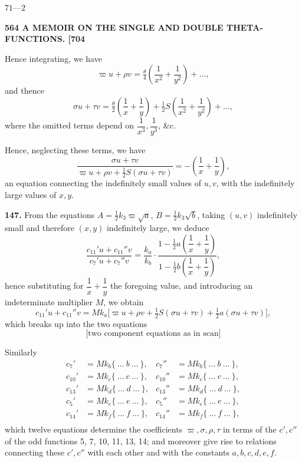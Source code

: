 \documentclass[11pt]{article}
\begin{document}
\hfill $71$---$2$

\newpage
\noindent\textbf{564 \hfill A MEMOIR ON THE SINGLE AND DOUBLE THETA-FUNCTIONS. \hfill [704}

\medskip
Hence integrating, we have
\[
\varpi u + \rho v = \tfrac{\theta}{4}\!\left(\frac{1}{x^2} + \frac{1}{y^2}\right) + \ldots,
\]
and thence
\[
\sigma u + \tau v = \tfrac{\theta}{2}\!\left(\frac{1}{x} + \frac{1}{y}\right) + \tfrac{1}{2}S\!\left(\frac{1}{x^2} + \frac{1}{y^2}\right) + \ldots,
\]
where the omitted terms depend on $\dfrac{1}{x^3},\dfrac{1}{y^3}$, \&c.

\medskip
Hence, neglecting these terms, we have
\[
\frac{\sigma u + \tau v}{\varpi u + \rho v + \tfrac{1}{2}S(\sigma u + \tau v)} = -\!\left(\frac{1}{x} + \frac{1}{y}\right),
\]
an equation connecting the indefinitely small values of $u, v$, with the indefinitely large values of $x, y$.

\medskip
\textbf{147.} From the equations $A = \tfrac{1}{2}k_3\varpi\sqrt{a}$, $B = \tfrac{1}{2}k_3\sqrt{b}$, taking $(u, v)$ indefinitely small and therefore $(x, y)$ indefinitely large, we deduce
\[
\frac{c_{11}'u + c_{11}''v}{c_7'u + c_7''v} = \frac{k_a}{k_b}\cdot\frac{1 - \tfrac{1}{2}a\!\left(\dfrac{1}{x} + \dfrac{1}{y}\right)}{1 - \tfrac{1}{2}b\!\left(\dfrac{1}{x} + \dfrac{1}{y}\right)},
\]
hence substituting for $\dfrac{1}{x} + \dfrac{1}{y}$ the foregoing value, and introducing an indeterminate multiplier $M$, we obtain
\[
c_{11}'u + c_{11}''v = Mk_a\bigl[\varpi u + \rho v + \tfrac{1}{2}S(\sigma u + \tau v) + \tfrac{1}{2}a(\sigma u + \tau v)\bigr],
\]
which breaks up into the two equations
\[
\text{[two component equations as in scan]}
\]

Similarly
\[
\begin{aligned}
c_7' &= Mk_b\{\ \ldots\ b\ \ldots\ \}, & c_7'' &= Mk_b\{\ \ldots\ b\ \ldots\ \},\\
c_{10}' &= Mk_c\{\ \ldots\ c\ \ldots\ \}, & c_{10}'' &= Mk_c\{\ \ldots\ c\ \ldots\ \},\\
c_{13}' &= Mk_d\{\ \ldots\ d\ \ldots\ \}, & c_{13}'' &= Mk_d\{\ \ldots\ d\ \ldots\ \},\\
c_5' &= Mk_e\{\ \ldots\ e\ \ldots\ \}, & c_5'' &= Mk_e\{\ \ldots\ e\ \ldots\ \},\\
c_{14}' &= Mk_f\{\ \ldots\ f\ \ldots\ \}, & c_{14}'' &= Mk_f\{\ \ldots\ f\ \ldots\ \},\\
\end{aligned}
\]
which twelve equations determine the coefficients $\varpi, \sigma, \rho, \tau$ in terms of the $c', c''$ of the odd functions 5, 7, 10, 11, 13, 14; and moreover give rise to relations connecting these $c', c''$ with each other and with the constants $a, b, c, d, e, f$.
\end{document}
